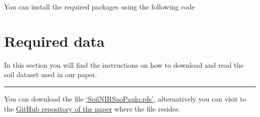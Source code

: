 \documentclass[]{book}
\newenvironment{Shaded}{\begin{snugshade}}{\end{snugshade}}
\newcommand{\ControlFlowTok}[1]{\textcolor[rgb]{0.13,0.29,0.53}{\textbf{#1}}}
\newcommand{\DataTypeTok}[1]{\textcolor[rgb]{0.13,0.29,0.53}{#1}}
\newcommand{\DecValTok}[1]{\textcolor[rgb]{0.00,0.00,0.81}{#1}}
\newcommand{\KeywordTok}[1]{\textcolor[rgb]{0.13,0.29,0.53}{\textbf{#1}}}
\newcommand{\NormalTok}[1]{#1}
\newcommand{\OperatorTok}[1]{\textcolor[rgb]{0.81,0.36,0.00}{\textbf{#1}}}
\newcommand{\OtherTok}[1]{\textcolor[rgb]{0.56,0.35,0.01}{#1}}
\newcommand{\StringTok}[1]{\textcolor[rgb]{0.31,0.60,0.02}{#1}}
\begin{document}
You can install the required packages using the following code

\begin{Shaded}
\end{Shaded}

\hypertarget{required-data}{%
\chapter{Required data}\label{required-data}}

In this section you will find the instructions on how to download and read the soil dataset used in our paper.

\begin{center}\rule{0.5\linewidth}{\linethickness}\end{center}

You can download the file \href{https://github.com/l-ramirez-lopez/VNIR_spectroscopy_for_robust_soil_mapping/raw/master/SoilNIRSaoPaulo.rds}{`SoilNIRSaoPaulo.rds'}, alternatively you can visit to the \href{https://github.com/l-ramirez-lopez/VNIR_spectroscopy_for_robust_soil_mapping}{GitHub repository of the paper} where the file resides.
\end{document}
